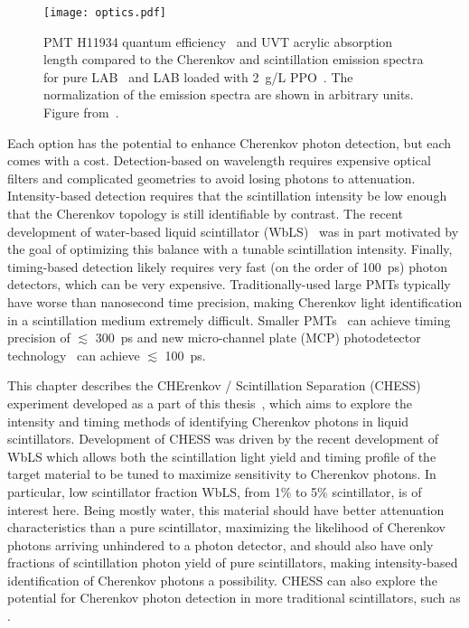 \begin{figure}
\centering
\texttt{[image: optics.pdf]}
\caption{\label{fig:optics} PMT H11934 quantum efficiency~\cite{h11934} and UVT acrylic absorption length compared to the Cherenkov and scintillation emission spectra for pure LAB~\cite{lab_emission} and LAB loaded with 2~g/L PPO~\cite{snop_private}. The normalization of the emission spectra are shown in arbitrary units. Figure from~\cite{chess_nim}.}
\end{figure}

Each option has the potential to enhance Cherenkov photon detection, but each comes with a cost.
Detection-based on wavelength requires expensive optical filters and complicated geometries to avoid losing photons to attenuation.
Intensity-based detection requires that the scintillation intensity be low enough that the Cherenkov topology is still identifiable by contrast.
The recent development of water-based liquid scintillator (WbLS)~\cite{wbls} was in part motivated by the goal of optimizing this balance with a tunable scintillation intensity.
Finally, timing-based detection likely requires very fast (on the order of 100~ps) photon detectors, which can be very expensive.
Traditionally-used large PMTs typically have worse than nanosecond time precision, making Cherenkov light identification in a scintillation medium extremely difficult.
Smaller PMTs~\cite{h11934} can achieve timing precision of $\lesssim$ 300~ps and new micro-channel plate (MCP) photodetector technology~\cite{mcp, lappd, lappd2} can achieve  $\lesssim$ 100~ps.


This chapter describes the CHErenkov / Scintillation Separation (CHESS) experiment developed as a part of this thesis~\cite{chess_nim}, which aims to explore the intensity and timing methods of identifying Cherenkov photons in liquid scintillators. 
Development of CHESS was driven by the recent development of WbLS which allows both the scintillation light yield and timing profile of the target material to be tuned to maximize sensitivity to Cherenkov photons.  
In particular, low scintillator fraction WbLS, from 1\% to 5\% scintillator, is of interest here. 
Being mostly water, this material should have better attenuation characteristics than a pure scintillator, maximizing the likelihood of Cherenkov photons arriving unhindered to a photon detector, and should also have only fractions of scintillation photon yield of pure scintillators, making intensity-based identification of Cherenkov photons a possibility.
CHESS can also explore the potential for Cherenkov photon detection in more traditional scintillators, such as {\labppo}.

